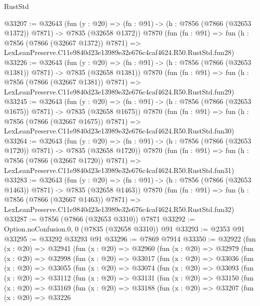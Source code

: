 \begin{lexlean}{RustStd}
\begin{coremodule}
@33207 := @32643
    (fun (y : @20) =>
    (fn : @91) -> (h : @7856 (@7866 (@32653 @1372)) @7871) -> @7835 (@32658 @1372))
    @7870
    (fun (fn : @91) =>
    fun (h : @7856 (@7866 (@32667 @1372)) @7871) =>
    LexLeanPreserve.C11e9840d23e13989e32e676c4caf4624.R50.RustStd.fun28)
@33226 := @32643
    (fun (y : @20) =>
    (fn : @91) -> (h : @7856 (@7866 (@32653 @1381)) @7871) -> @7835 (@32658 @1381))
    @7870
    (fun (fn : @91) =>
    fun (h : @7856 (@7866 (@32667 @1381)) @7871) =>
    LexLeanPreserve.C11e9840d23e13989e32e676c4caf4624.R50.RustStd.fun29)
@33245 := @32643
    (fun (y : @20) =>
    (fn : @91) -> (h : @7856 (@7866 (@32653 @1675)) @7871) -> @7835 (@32658 @1675))
    @7870
    (fun (fn : @91) =>
    fun (h : @7856 (@7866 (@32667 @1675)) @7871) =>
    LexLeanPreserve.C11e9840d23e13989e32e676c4caf4624.R50.RustStd.fun30)
@33264 := @32643
    (fun (y : @20) =>
    (fn : @91) -> (h : @7856 (@7866 (@32653 @1720)) @7871) -> @7835 (@32658 @1720))
    @7870
    (fun (fn : @91) =>
    fun (h : @7856 (@7866 (@32667 @1720)) @7871) =>
    LexLeanPreserve.C11e9840d23e13989e32e676c4caf4624.R50.RustStd.fun31)
@33283 := @32643
    (fun (y : @20) =>
    (fn : @91) -> (h : @7856 (@7866 (@32653 @1463)) @7871) -> @7835 (@32658 @1463))
    @7870
    (fun (fn : @91) =>
    fun (h : @7856 (@7866 (@32667 @1463)) @7871) =>
    LexLeanPreserve.C11e9840d23e13989e32e676c4caf4624.R50.RustStd.fun32)
@33287 := @7856 (@7866 (@32653 @3310)) @7871
@33292 := Option.noConfusion.{0, 0} (@7835 (@32658 @3310)) @91
@33293 := @2353 @91
@33295 := @33292 @33293 @91
@33296 := @7869 @7914
@33350 := @32922
    (fun (x : @20) =>
    @32941
      (fun (x : @20) =>
      @32960
        (fun (x : @20) =>
        @32979
          (fun (x : @20) =>
          @32998
            (fun (x : @20) =>
            @33017
              (fun (x : @20) =>
              @33036
                (fun (x : @20) =>
                @33055
                  (fun (x : @20) =>
                  @33074
                    (fun (x : @20) =>
                    @33093
                      (fun (x : @20) =>
                      @33112
                        (fun (x : @20) =>
                        @33131
                          (fun (x : @20) =>
                          @33150
                            (fun (x : @20) =>
                            @33169
                              (fun (x : @20) =>
                              @33188
                                (fun (x : @20) =>
                                @33207
                                  (fun (x : @20) =>
                                  @33226

\end{coremodule}
\end{lexlean}
